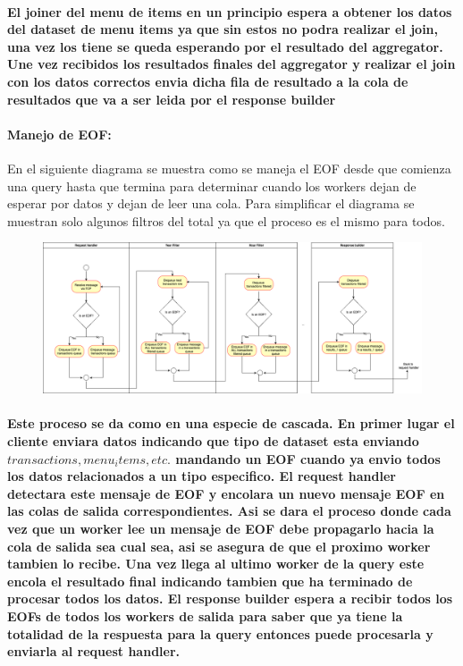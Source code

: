\documentclass[titlepage,a4paper]{article}
\begin{document}
\paragraph{El joiner del menu de items en un principio espera a obtener los datos del dataset de menu items ya que sin estos no podra realizar el join, una vez los tiene se queda esperando por el resultado del aggregator. Une vez recibidos los resultados finales del aggregator y realizar el join con los datos correctos envia dicha fila de resultado a la cola de resultados que va a ser leida por el response builder }

\paragraph{Manejo de EOF:}En el siguiente diagrama se muestra como se maneja el EOF desde que comienza una query hasta que termina para determinar cuando los workers dejan de esperar por datos y dejan de leer una cola. Para simplificar el diagrama se muestran solo algunos filtros del total ya que el proceso es el mismo para todos.
\begin{figure}[H]
    \centering
    \includegraphics[width=1\linewidth]{actividades-eof.png}
\end{figure}
\paragraph{Este proceso se da como en una especie de cascada. En primer lugar el cliente enviara datos indicando que tipo de dataset esta enviando \(transactions, menu_items, etc.\) mandando un EOF cuando ya envio todos los datos relacionados a un tipo especifico. El request handler detectara este mensaje de EOF y encolara un nuevo mensaje EOF en las colas de salida correspondientes. Asi se dara el proceso donde cada vez que un worker lee un mensaje de EOF debe propagarlo hacia la cola de salida sea cual sea, asi se asegura de que el proximo worker tambien lo recibe. Una vez llega al ultimo worker de la query este encola el resultado final indicando tambien que ha terminado de procesar todos los datos. El response builder espera a recibir todos los EOFs de todos los workers de salida para saber que ya tiene la totalidad de la respuesta para la query entonces puede procesarla y enviarla al request handler.}
\end{document}
